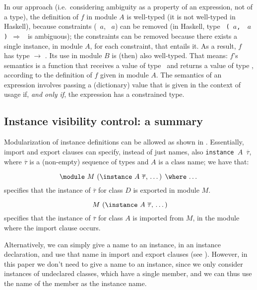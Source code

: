 In our approach (i.e.~considering ambiguity as a property of an
expression, not of a type), the definition of $f$ in module $A$ is
well-typed (it is not well-typed in Haskell), because constraints
(\SShow\ $a$, \RRead\ $a$) can be removed (in Haskell, type {\tt
  (\SShow\ $a$, \RRead\ $a$) $\Rightarrow$ \String} is ambiguous); the
constraints can be removed because there exists a single instance, in
module $A$, for each constraint, that entails it. As a result, $f$ has
type \String $\rightarrow$ \String. Its use in module $B$ is (then)
also well-typed. That means: $f$'s semantics is a function that
receives a value of type \String\ and returns a value of type \String,
according to the definition of $f$ given in module $A$. The semantics
of an expression involves passing a (dictionary) value that is given
in the context of usage if, {\em and only if}, the expression has a
constrained type.

\subsection{Instance visibility control: a summary}
\label{subsec:instance-visibility-control}

Modularization of instance definitions can be allowed as shown in
\cite{Controlling-scope-instances}. Essentially, import and export
clauses can specify, instead of just names, also {\tt instance $A$
  $\overline{\tau}$}, where $\overline{\tau}$ is a (non-empty)
sequence of types and $A$ is a class name; we have that:

  \[ \text{\module\ $M$ (\instance\ $A$ $\overline{\tau}$, \ldots) \where\ \ldots} \]
specifies that the instance of $\overline{\tau}$ for class $D$ is
exported in module $M$.

  \[ \text{\ $M$ (\instance\ $A$ $\overline{\tau}$, \ldots)} \]
specifies that the instance of $\overline{\tau}$ for class $A$ is
imported from $M$, in the module where the import clause occurs.

Alternatively, we can simply give a name to an instance, in an
instance declaration, and use that name in import and export clauses
(see \cite{Controlling-scope-instances}). However, in this paper we
don't need to give a name to an instance, since we only consider
instances of undeclared classes, which have a single member, and we
can thus use the name of the member as the instance name. 


